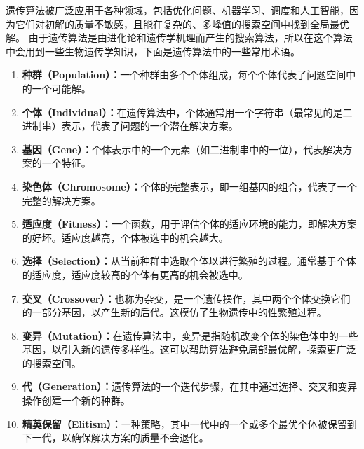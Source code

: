 遗传算法被广泛应用于各种领域，包括优化问题、机器学习、调度和人工智能，因为它们对初解的质量不敏感，且能在复杂的、多峰值的搜索空间中找到全局最优解。
由于遗传算法是由进化论和遗传学机理而产生的搜索算法，所以在这个算法中会用到一些生物遗传学知识，下面是遗传算法中的一些常用术语。
\begin{enumerate}
  \item \textbf{种群（Population）：}一个种群由多个个体组成，每个个体代表了问题空间中的一个可能解。

  \item \textbf{个体（Individual）：}在遗传算法中，个体通常用一个字符串（最常见的是二进制串）表示，代表了问题的一个潜在解决方案。
  
  \item \textbf{基因（Gene）：}个体表示中的一个元素（如二进制串中的一位），代表解决方案的一个特征。
  
  \item \textbf{染色体（Chromosome）：}个体的完整表示，即一组基因的组合，代表了一个完整的解决方案。
  
  \item \textbf{适应度（Fitness）：}一个函数，用于评估个体的适应环境的能力，即解决方案的好坏。适应度越高，个体被选中的机会越大。
  
  \item \textbf{选择（Selection）：}从当前种群中选取个体以进行繁殖的过程。通常基于个体的适应度，适应度较高的个体有更高的机会被选中。
  
  \item \textbf{交叉（Crossover）：}也称为杂交，是一个遗传操作，其中两个个体交换它们的一部分基因，以产生新的后代。这模仿了生物遗传中的性繁殖过程。
  
  \item \textbf{变异（Mutation）：}在遗传算法中，变异是指随机改变个体的染色体中的一些基因，以引入新的遗传多样性。这可以帮助算法避免局部最优解，探索更广泛的搜索空间。
  
  \item \textbf{代（Generation）：}遗传算法的一个迭代步骤，在其中通过选择、交叉和变异操作创建一个新的种群。
  
  \item \textbf{精英保留（Elitism）：}一种策略，其中一代中的一个或多个最优个体被保留到下一代，以确保解决方案的质量不会退化。
  \end{enumerate}

